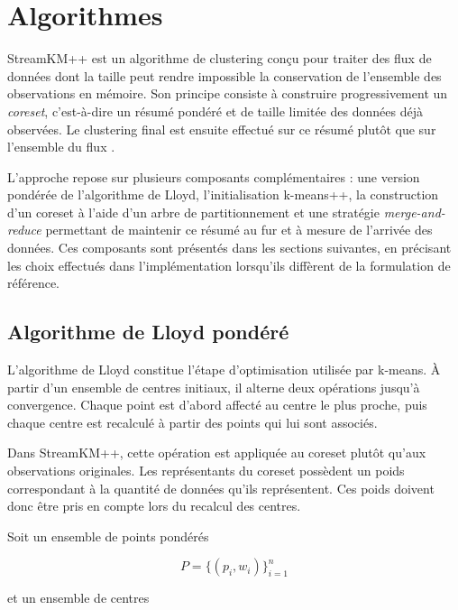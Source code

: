 
\chapter{Algorithmes}
\label{ch:algorithmes}

StreamKM++ est un algorithme de clustering conçu pour traiter des flux de données dont la taille peut rendre impossible la conservation de l'ensemble des observations en mémoire. Son principe consiste à construire progressivement un \emph{coreset}, c'est-à-dire un résumé pondéré et de taille limitée des données déjà observées. Le clustering final est ensuite effectué sur ce résumé plutôt que sur l'ensemble du flux \cite{ackermann2012}.

L'approche repose sur plusieurs composants complémentaires : une version pondérée de l'algorithme de Lloyd, l'initialisation k-means++, la construction d'un coreset à l'aide d'un arbre de partitionnement et une stratégie \emph{merge-and-reduce} permettant de maintenir ce résumé au fur et à mesure de l'arrivée des données. Ces composants sont présentés dans les sections suivantes, en précisant les choix effectués dans l'implémentation lorsqu'ils diffèrent de la formulation de référence.

\section{Algorithme de Lloyd pondéré}

L'algorithme de Lloyd constitue l'étape d'optimisation utilisée par k-means. À partir d'un ensemble de centres initiaux, il alterne deux opérations jusqu'à convergence. Chaque point est d'abord affecté au centre le plus proche, puis chaque centre est recalculé à partir des points qui lui sont associés.

Dans StreamKM++, cette opération est appliquée au coreset plutôt qu'aux observations originales. Les représentants du coreset possèdent un poids correspondant à la quantité de données qu'ils représentent. Ces poids doivent donc être pris en compte lors du recalcul des centres.

Soit un ensemble de points pondérés

\[
P = \{(p_i,w_i)\}_{i=1}^{n}
\]

et un ensemble de centres


